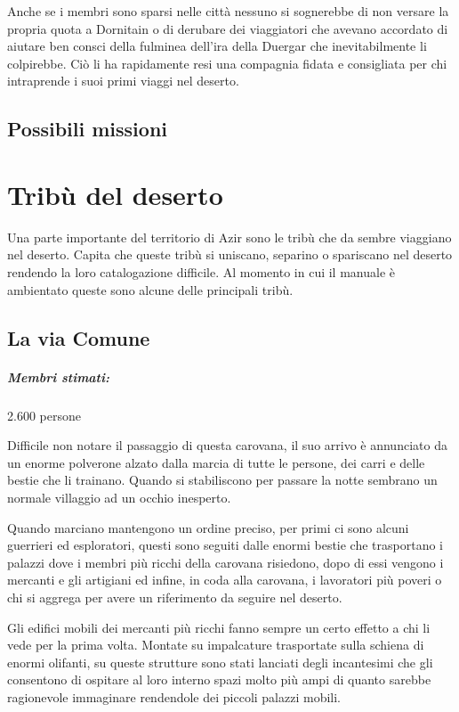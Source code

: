 \documentclass[letterpaper,twocolumn,openany,nodeprecatedcode]{dndbook}
\begin{document}
Anche se i membri sono sparsi nelle città nessuno si sognerebbe di non versare la propria quota a Dornitain o di derubare dei viaggiatori che avevano accordato di aiutare ben consci della fulminea dell'ira della Duergar che inevitabilmente li colpirebbe. Ciò li ha rapidamente resi una compagnia fidata e consigliata per chi intraprende i suoi primi viaggi nel deserto.


\section{Possibili missioni}

\chapter{Tribù del deserto}
Una parte importante del territorio di Azir sono le tribù che da sembre viaggiano nel deserto. Capita che queste tribù si uniscano, separino o spariscano nel deserto rendendo la loro catalogazione difficile. Al momento in cui il manuale è ambientato queste sono alcune delle principali tribù.

\section{La via Comune}
\paragraph{Membri stimati:} 2.600 persone

Difficile non notare il passaggio di questa carovana, il suo arrivo è annunciato da un enorme polverone alzato dalla marcia di tutte le persone, dei carri e delle bestie che li trainano. Quando si stabiliscono per passare la notte sembrano un normale villaggio ad un occhio inesperto. 

Quando marciano mantengono un ordine preciso, per primi ci sono alcuni guerrieri ed esploratori, questi sono seguiti dalle enormi bestie che trasportano i palazzi dove i membri più ricchi della carovana risiedono, dopo di essi vengono i mercanti e gli artigiani ed infine, in coda alla carovana, i lavoratori più poveri o chi si aggrega per avere un riferimento da seguire nel deserto. 

Gli edifici mobili dei mercanti più ricchi fanno sempre un certo effetto a chi li vede per la prima volta. Montate su impalcature trasportate sulla schiena di enormi olifanti, su queste strutture sono stati lanciati degli incantesimi che gli consentono di ospitare al loro interno spazi molto più ampi di quanto sarebbe ragionevole immaginare rendendole dei piccoli palazzi mobili.
\end{document}
